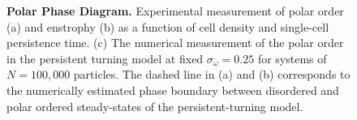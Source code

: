 \documentclass[reprint,unsortedaddress,amsmath,amssymb,aps,pre]{revtex4-2}
\begin{document}
\begin{figure}[ht!]
        \caption{\label{fig::ExperimentalVsSimulationPhaseDiagrams}
        \textbf{Polar Phase Diagram.}
        Experimental measurement of polar order (a) and enstrophy (b) as a function of cell density and single-cell persistence time. (c) The numerical measurement of the polar order in the persistent turning model at fixed $\sigma_{\omega}=0.25$ for systems of  $N=100,000$ particles. The dashed line in (a) and (b) corresponds to the numerically estimated  phase boundary between disordered and polar ordered steady-states of the persistent-turning model.}
\end{figure}
\end{document}
